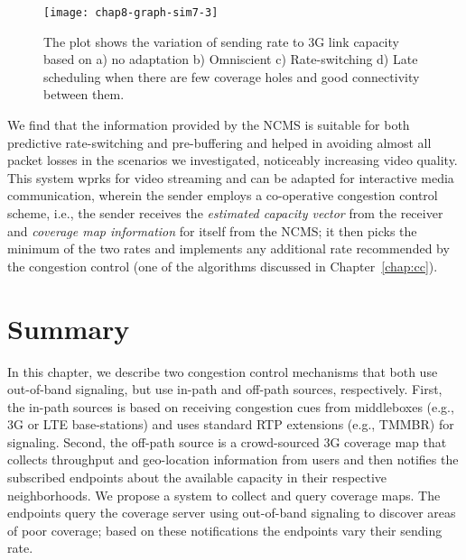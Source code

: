 \begin{figure}
\texttt{[image: chap8-graph-sim7-3]}
  \caption{The plot shows the variation of sending rate to 3G link capacity
  based on a) no adaptation b) Omniscient c) Rate-switching d) Late scheduling
  when there are few coverage holes and good connectivity between them.}
\label{fig:glass:sim7res}
\end{figure}


We find that the information provided by the NCMS is suitable for both
predictive rate-switching and  pre-buffering and helped in avoiding almost all
packet losses in the scenarios we investigated, noticeably increasing video
quality. This system wprks for video streaming and can be adapted for
interactive media communication, wherein the sender employs a co-operative
congestion control scheme, i.e., the sender receives the \emph{estimated
capacity vector} from the receiver and \emph{coverage map information} for
itself from the NCMS; it then picks the minimum of the two rates and implements any
additional rate recommended by the congestion control (one of the algorithms
discussed in Chapter~\ref{chap:cc}).

\section{Summary}

In this chapter, we describe two congestion control mechanisms that both use 
out-of-band signaling, but use in-path and off-path sources, respectively. First,
the in-path sources is based on receiving congestion cues from middleboxes
(e.g., 3G or LTE base-stations) and uses standard RTP extensions (e.g., TMMBR)
for signaling. Second, the off-path source is a crowd-sourced 3G coverage
map that collects throughput and geo-location information from users and then
notifies the subscribed endpoints about the available capacity in their
respective neighborhoods. We propose a system to collect and query coverage
maps. The endpoints query the coverage server using out-of-band signaling to
discover areas of poor coverage; based on these notifications the endpoints
vary their sending rate.

